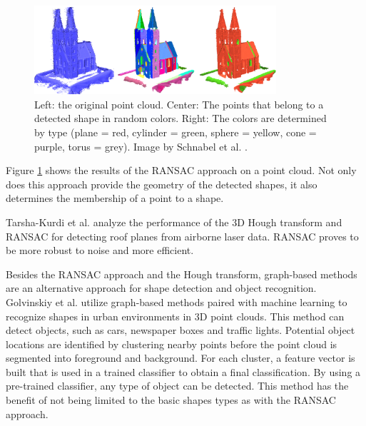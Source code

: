 \begin{figure}
    \centering
    \includegraphics[width=0.8\textwidth]{Related_Work/schnabel_example.png}%
    \caption[Church with points colored by detected shape]
		{Left: the original point cloud. Center: The points that belong to a detected shape in random colors. Right: The colors are determined by type (plane = red, cylinder = green, sphere = yellow, cone = purple, torus = grey). Image by Schnabel et al. \cite{schnabel-2007-efficient}. }
    \label{fig:schnabel_church}
\end{figure}

Figure \ref{fig:schnabel_church} shows the results of the RANSAC approach on a point cloud. Not only does this approach provide the geometry of the detected shapes, it also determines the membership of a point to a shape. 

\par

Tarsha-Kurdi et al. \cite{tarsha2007hough} analyze the performance of the 3D Hough transform and RANSAC for detecting roof planes from airborne laser data. RANSAC proves to be more robust to noise and more efficient.

\par

Besides the RANSAC approach and the Hough transform, graph-based methods are an alternative approach for shape detection and object recognition. Golvinskiy et al. \cite{golovinskiy2009shape} utilize graph-based methods paired with machine learning to recognize shapes in urban environments in 3D point clouds. This method can detect objects, such as cars, newspaper boxes and traffic lights. Potential object locations are identified by clustering nearby points before the point cloud is segmented into foreground and background. For each cluster, a feature vector is built that is used in a trained classifier to obtain a final classification. By using a pre-trained classifier, any type of object can be detected. This method has the benefit of not being limited to the basic shapes types as with the RANSAC approach. 

\par

